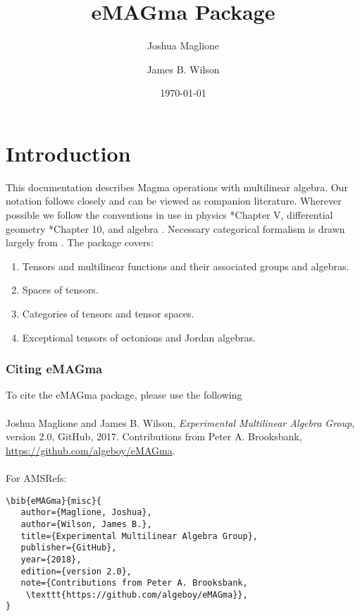 \documentclass{documentation}
\title{eMAGma Package}
\author{Joshua Maglione}
\author{James B. Wilson}
\date{\today}
\begin{document}
\frontmatter

\dominitoc
\maketitle
\tableofcontents

\mainmatter

\chapter{Introduction}

This documentation describes Magma operations with multilinear algebra.
Our notation follows \cite{FMW:densors} closely and can be viewed as companion literature. 
Wherever possible we follow the conventions in use in physics \cite{Weyl}*{Chapter V}, differential geometry \cite{Lee:geom}*{Chapter 10}, and algebra \cite{Landsberg:tensors}.
Necessary categorical formalism is drawn largely from
\cite{Wilson:division}.  
The package covers:
\begin{enumerate}
\item Tensors and multilinear functions and their associated groups and algebras.
\item Spaces of tensors.
\item Categories of tensors and tensor spaces.
\item Exceptional tensors of octonions and Jordan algebras.
\end{enumerate}
\bigskip

\subsection*{Citing eMAGma} 
To cite the eMAGma package, please use the following\\
\\
Joshua Maglione and James B. Wilson, \emph{Experimental Multilinear Algebra Group}, version 2.0, GitHub, 2017. Contributions from Peter A. Brooksbank, \url{https://github.com/algeboy/eMAGma}. \\
\\
For AMSRefs:
\begin{verbatim}
\bib{eMAGma}{misc}{
   author={Maglione, Joshua},
   author={Wilson, James B.},
   title={Experimental Multilinear Algebra Group},
   publisher={GitHub},
   year={2018},
   edition={version 2.0},
   note={Contributions from Peter A. Brooksbank, 
    \texttt{https://github.com/algeboy/eMAGma}},
}
\end{verbatim}
\end{document}
